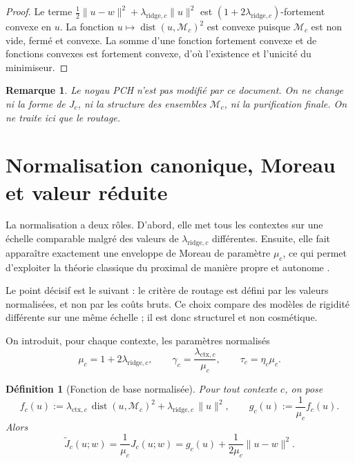 \documentclass[11pt,a4paper]{article}
\newtheorem{definition}{Définition}[section]
\newtheorem{remark}{Remarque}[section]
\DeclareMathOperator{\dist}{dist}
\newcommand{\Mcal}{\mathcal M}
\begin{document}
\begin{proof}
Le terme \(\frac12\|u-w\|^2+\lambda_{\mathrm{ridge},c}\|u\|^2\) est \((1+2\lambda_{\mathrm{ridge},c})\)-fortement convexe en \(u\). La fonction \(u\mapsto \dist(u,\Mcal_c)^2\) est convexe puisque \(\Mcal_c\) est non vide, fermé et convexe. La somme d'une fonction fortement convexe et de fonctions convexes est fortement convexe, d'où l'existence et l'unicité du minimiseur.
\end{proof}

\begin{remark}
Le noyau PCH n'est pas modifié par ce document. On ne change ni la forme de \(J_c\), ni la structure des ensembles \(\Mcal_c\), ni la purification finale. On ne traite ici que le routage.
\end{remark}

\section{Normalisation canonique, Moreau et valeur réduite}

La normalisation a deux rôles. D'abord, elle met tous les contextes sur une échelle comparable malgré des valeurs de \(\lambda_{\mathrm{ridge},c}\) différentes. Ensuite, elle fait apparaître exactement une enveloppe de Moreau de paramètre \(\mu_c\), ce qui permet d'exploiter la théorie classique du proximal de manière propre et autonome \cite{Moreau1965,Rockafellar1970,BauschkeCombettes2017}.

Le point décisif est le suivant : le critère de routage est défini par les valeurs normalisées, et non par les coûts bruts. Ce choix compare des modèles de rigidité différente sur une même échelle ; il est donc structurel et non cosmétique.

On introduit, pour chaque contexte, les paramètres normalisés
\[
\mu_c = 1 + 2\lambda_{\mathrm{ridge},c},
\qquad
\gamma_c = \frac{\lambda_{\mathrm{ctx},c}}{\mu_c},
\qquad
\tau_c = \eta_c \mu_c.
\]

\begin{definition}[Fonction de base normalisée]
Pour tout contexte \(c\), on pose
\[
f_c(u):=\lambda_{\mathrm{ctx},c}\,\dist(u,\Mcal_c)^2+\lambda_{\mathrm{ridge},c}\,\|u\|^2,
\qquad
g_c(u):=\frac{1}{\mu_c}f_c(u).
\]
Alors
\[
\widetilde J_c(u;w)=\frac{1}{\mu_c}J_c(u;w)
=
 g_c(u)+\frac{1}{2\mu_c}\|u-w\|^2.
\]
\end{definition}
\end{document}
